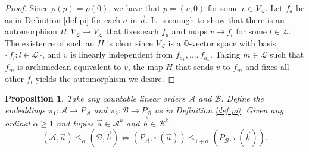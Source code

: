 \documentclass{amsart}%
\numberwithin{theorem}{section}
\newtheorem{proposition}[theorem]{Proposition}
\newcommand{\Q}{\mathbb{Q}}
\newcommand{\A}{\mathcal{A}}
\newcommand{\B}{\mathcal{B}}
\newcommand{\0}{\emptyset}
\newcommand{\LL}{\mathcal{L}}
\begin{document}
\begin{proof}
    Since $\rho(p)=\rho(0)$, we have that $p=(v,0)$ for some $v\in V_\LL$. Let $f_a$ be as in Definition \ref{def pi} for each $a$ in $\vec a$. It is enough to show that there is an automorphism $H:V_\LL\to V_\LL$ that fixes each $f_a$ and maps $v\mapsto f_l$ for some $l\in \LL$. The existence of such an $H$ is clear since $V_\LL$ is a $\Q$-vector space with basis $\{f_l:l\in \LL\}$, and $v$ is linearly independent from $f_{a_1},...,f_{a_k}$. Taking $m\in \LL$ such that $f_m$ is archimedean equivalent to $v$,  the map $H$ that sends $v$ to $f_m$ and fixes all other $f_l$ yields the automorphism we desire.
\end{proof}





\begin{proposition}
    Take any countable linear orders $\A$ and $\B$. Define the embeddings $\pi_1:\A\to P_{\A}$ and $\pi_2:\B\to P_{\B}$ as in Definition \ref{def pi}. Given any ordinal $\alpha\geq 1$ and tuples $\vec a\in \A^k$ and $\vec b\in \B^k$, $$(\A,\vec a)\leq_\alpha (\B, \vec b) \iff (P_{\A},\pi(\vec a))\leq_{1+\alpha} (P_{\B}, \pi(\vec b)).$$ 
\end{proposition}
\end{document}

